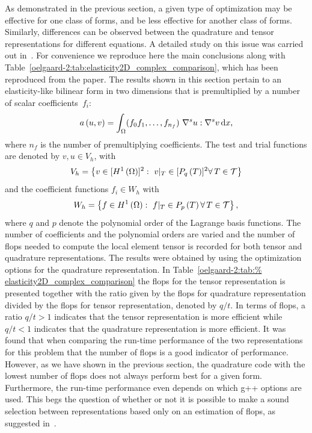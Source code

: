 As demonstrated in the previous section, a given type of optimization
may be effective for one class of forms, and be less effective for
another class of forms.  Similarly, differences can be observed
between the quadrature and tensor representations for different
equations.  A detailed study on this issue was carried out
in~\citet{OelgaardWells2010}.  For convenience we reproduce here the
main conclusions along with
Table~\ref{oelgaard-2:tab:elasticity2D_complex_comparison}, which has
been reproduced from the paper.  The results shown in this section
pertain to an elasticity-like bilinear form in two dimensions that is
premultiplied by a number of scalar coefficients~$f_{i}$:
%
\begin{equation}
  a\left( {u, v} \right) = \int_{\Omega} (f_0 f_1, \ldots, f_{n_f} )\ \nabla^s u
  : \nabla^s v \, \mathrm{d}x,
  \label{oelgaard-2:eq:elasticity_form}
\end{equation}
%
where $n_f$ is the number of premultiplying coefficients.
The test and trial functions are denoted by $v, u \in V_{h}$, with
%
\begin{equation}
  V_{h} = \left\{ {v \in [H^{1}\left( {\Omega} \right)]^2: \ v\vert_T \in
    [P_{q}\left( {T} \right)]^2 \forall\, T \in \mathcal{T}} \right\}
 \label{oelgaard-2:eq:elastictity_H1_vector_space}
\end{equation}
%
and the coefficient functions $f_{i} \in W_{h}$ with
%
\begin{equation}
  W_{h} = \left\{ {f \in H^{1}\left( {\Omega} \right): \ f\vert_T \in
    P_{p}\left( {T} \right) \forall\, T \in \mathcal{T}} \right\},
 \label{oelgaard-2:eq:elasticity_H1_space}
\end{equation}
%
where $q$ and $p$ denote the polynomial order of the
Lagrange basis functions.  The number of coefficients and the
polynomial orders are varied and the number of flops needed to compute
the local element tensor is recorded for both tensor and quadrature
representations.  The results were obtained by using the optimization
options  for the
quadrature representation.  In Table~\ref{oelgaard-2:tab:%
elasticity2D_complex_comparison} the flops for the tensor
representation is presented together with the ratio given by the flops
for quadrature representation divided by the flops for tensor
representation, denoted by $q/t$.  In terms of flops, a ratio $q/t >
1$ indicates that the tensor representation is more efficient while
$q/t < 1$ indicates that the quadrature representation is more
efficient.  It was found that when comparing the run-time performance
of the two representations for this problem that the number of flops
is a good indicator of performance.  However, as we have shown in the
previous section, the quadrature code with the lowest number of flops
does not always perform best for a given form. Furthermore, the
run-time performance even depends on which g++ options are used.  This
begs the question of whether or not it is possible to make a sound
selection between representations based only on an estimation of
flops, as suggested in~\citet{OelgaardWells2010}.

